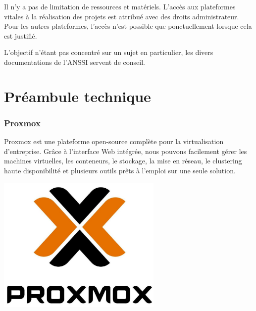 \documentclass[12pt, a4paper, twoside]{article}
\begin{document}
Il n'y a pas de limitation de ressources et matériels.
L'accès aux plateformes vitales à la réalisation des projets est attribué avec des droits administrateur.
Pour les autres plateformes, l'accès n'est possible que ponctuellement lorsque cela est justifié.

L'objectif n'étant pas concentré sur un sujet en particulier, les divers documentations de l'\gls{ANSSI} servent de conseil.

\newpage
\part{Préambule technique}
\label{part: preambule_technique}
\section{Proxmox}
\noindent%
\begin{minipage}{.7\textwidth}%
\gls{Proxmox} est une plateforme open-source complète pour la virtualisation d'entreprise. 
Grâce à l'interface Web intégrée, nous pouvons facilement gérer les machines virtuelles, les conteneurs, le stockage, la mise en réseau, le clustering haute disponibilité et plusieurs outils prêts à l'emploi sur une seule solution. \\

\end{minipage}%
\hfill
\begin{minipage}{.3\textwidth}%
\begin{center}
\includegraphics[width=0.6\textwidth]{src/logo_proxmox.JPG}
\end{center}
\end{minipage}%
\end{document}
